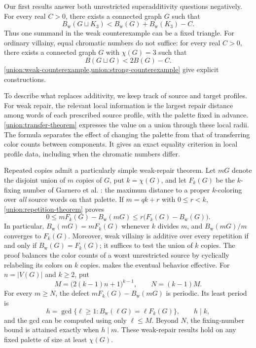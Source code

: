 \documentclass[10pt,a4paper]{amsart}
\numberwithin{equation}{section}
\theoremstyle{definition}
\theoremstyle{remark}
\begin{document}
Our first results answer both unrestricted superadditivity questions
negatively. For every real $C>0$,
there exists a connected graph $G$ such that
\[
 B_{\mathrm w}(G\sqcup K_3)
 <B_{\mathrm w}(G)+B_{\mathrm w}(K_3)-C.
\]
Thus one summand in the weak counterexample can be a fixed triangle.
For ordinary villainy, equal chromatic numbers do not suffice: for
every real $C>0$, there exists a connected graph $G$ with $\chi(G)=3$
such that
\[
 B(G\sqcup G)<2B(G)-C.
\]
\cref{union:weak-counterexample,union:strong-counterexample} give explicit constructions.

To describe what replaces additivity, we keep track of source and
target profiles. For weak repair, the relevant local information
is the largest repair distance among words of each prescribed source
profile, with the palette fixed in advance.
\cref{union:transfer-theorem}
expresses the value on a union through these local radii. The formula
separates the effect of changing the palette from that of transferring
color counts between components. It gives an exact equality criterion
in local profile data, including when the chromatic numbers differ.

Repeated copies admit a particularly simple weak-repair theorem. Let
$mG$ denote the disjoint union of $m$ copies of $G$, put $k=\chi(G)$,
and let $F_k(G)$ be the $k$-fixing number of Garnero et al.
\cite{garnero2018}: the maximum distance to a proper $k$-coloring over
\emph{all} source words on that palette. If $m=qk+r$ with $0\le r<k$,
\cref{union:repetition-theorem} proves
\[
 0\le mF_k(G)-B_{\mathrm w}(mG)
 \le r\bigl(F_k(G)-B_{\mathrm w}(G)\bigr).
\]
In particular, $B_{\mathrm w}(mG)=mF_k(G)$ whenever $k$ divides $m$,
and $B_{\mathrm w}(mG)/m$ converges to $F_k(G)$. Moreover, weak
villainy is additive over every repetition if and only if
$B_{\mathrm w}(G)=F_k(G)$; it suffices to test the union of $k$ copies.
The proof balances the color counts of a worst unrestricted source
by cyclically relabeling its colors on $k$ copies.
 makes the eventual behavior
effective. For $n=|V(G)|$ and $k\ge2$, put
\[
 M=\bigl(2(k-1)n+1\bigr)^{k-1},\qquad N=(k-1)M.
\]
For every $m\ge N$, the defect $mF_k(G)-B_{\mathrm w}(mG)$ is
periodic. Its least period is
\[
 h=\gcd\{\ell\ge1:B_{\mathrm w}(\ell G)=\ell F_k(G)\},
 \qquad h\mid k,
\]
and the gcd can be computed using only $\ell\le M$. Beyond $N$,
the fixing-number bound is attained exactly when $h\mid m$.
These weak-repair results hold on any fixed palette of size at least
$\chi(G)$.
\end{document}
